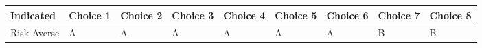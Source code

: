 \begin{tabular}{lllllllll}
\toprule
   Indicated & Choice 1 & Choice 2 & Choice 3 & Choice 4 & Choice 5 & Choice 6 & Choice 7 & Choice 8 \\
\midrule
 Risk Averse &        A &        A &        A &        A &        A &        A &        B &        B \\
\bottomrule
\end{tabular}
